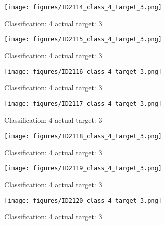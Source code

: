 \begin{figure}[h!]
\begin{center}
\texttt{[image: figures/ID2114\_class\_4\_target\_3.png]}
\end{center}
\caption{ Classification: 4 actual target: 3}
\label{fig:ID2114_class_4_target_3}
\end{figure}
\begin{figure}[h!]
\begin{center}
\texttt{[image: figures/ID2115\_class\_4\_target\_3.png]}
\end{center}
\caption{ Classification: 4 actual target: 3}
\label{fig:ID2115_class_4_target_3}
\end{figure}
\begin{figure}[h!]
\begin{center}
\texttt{[image: figures/ID2116\_class\_4\_target\_3.png]}
\end{center}
\caption{ Classification: 4 actual target: 3}
\label{fig:ID2116_class_4_target_3}
\end{figure}
\begin{figure}[h!]
\begin{center}
\texttt{[image: figures/ID2117\_class\_4\_target\_3.png]}
\end{center}
\caption{ Classification: 4 actual target: 3}
\label{fig:ID2117_class_4_target_3}
\end{figure}
\begin{figure}[h!]
\begin{center}
\texttt{[image: figures/ID2118\_class\_4\_target\_3.png]}
\end{center}
\caption{ Classification: 4 actual target: 3}
\label{fig:ID2118_class_4_target_3}
\end{figure}
\begin{figure}[h!]
\begin{center}
\texttt{[image: figures/ID2119\_class\_4\_target\_3.png]}
\end{center}
\caption{ Classification: 4 actual target: 3}
\label{fig:ID2119_class_4_target_3}
\end{figure}
\begin{figure}[h!]
\begin{center}
\texttt{[image: figures/ID2120\_class\_4\_target\_3.png]}
\end{center}
\caption{ Classification: 4 actual target: 3}
\label{fig:ID2120_class_4_target_3}
\end{figure}

